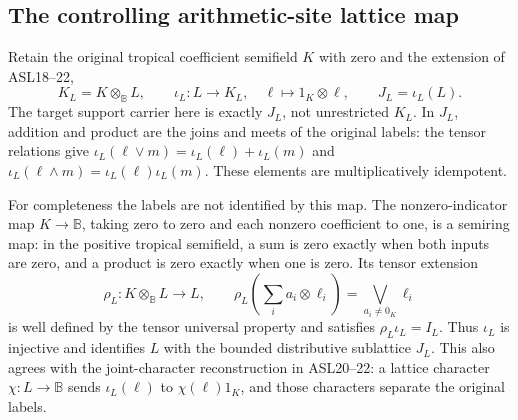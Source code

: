 \subsection{The controlling arithmetic-site lattice map}

Retain the original tropical coefficient semifield $K$
with zero and the extension of ASL18--22,
\begin{equation}\tag{SDKR32}
K_L=K\otimes_{\mathbb B}L,\qquad
\iota_L:L\to K_L,\quad\ell\mapsto1_K\otimes\ell,\qquad
J_L=\iota_L(L).
\end{equation}
The target support carrier here is exactly $J_L$,
not unrestricted $K_L$. In $J_L$, addition and product
are the joins and meets of the original labels:
the tensor relations give
$\iota_L(\ell\vee m)=\iota_L(\ell)+\iota_L(m)$ and
$\iota_L(\ell\wedge m)=\iota_L(\ell)\iota_L(m)$.
These elements are multiplicatively idempotent.

For completeness the labels are not identified by this
map. The nonzero-indicator map $K\to\mathbb B$, taking
zero to zero and each nonzero coefficient to one,
is a semiring map: in the positive tropical semifield,
a sum is zero exactly when both inputs are zero, and a
product is zero exactly when one is zero. Its tensor
extension
\[
\rho_L:K\otimes_{\mathbb B}L\to L,\qquad
\rho_L\!\left(\sum_i a_i\otimes\ell_i\right)
       =\bigvee_{a_i\ne0_K}\ell_i
\]
is well defined by the tensor universal property and
satisfies $\rho_L\iota_L=I_L$. Thus $\iota_L$ is
injective and identifies $L$ with the bounded
distributive sublattice $J_L$. This also agrees with
the joint-character reconstruction in ASL20--22:
a lattice character $\chi:L\to\mathbb B$ sends
$\iota_L(\ell)$ to $\chi(\ell)1_K$, and those
characters separate the original labels.

